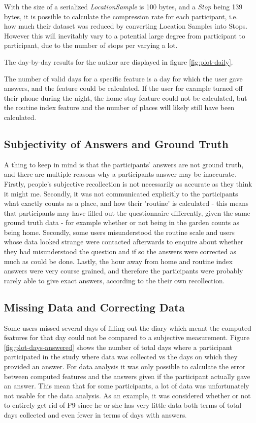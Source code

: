 With the size of a serialized \textit{LocationSample} is 100 bytes, and a \textit{Stop} being 139 bytes, it is possible to calculate the compression rate for each participant, i.e. how much their dataset was reduced by converting Location Samples into Stops. However this will inevitably vary to a potential large degree from participant to participant, due to the number of stops per  varying a lot.

The day-by-day results for the author are displayed in figure \ref{fig:plot-daily}.

The number of valid days for a specific feature is a day for which the user gave answers, and the feature could be calculated. If the user for example turned off their phone during the night, the home stay feature could not be calculated, but the routine index feature and the number of places will likely still have been calculated.


\subsection{Subjectivity of Answers and Ground Truth}
A thing to keep in mind is that the participants' answers are not ground truth, and there are multiple reasons why a participants answer may be inaccurate. Firstly, people's subjective recollection is not necessarily as accurate as they think it might me. Secondly, it was not communicated explicitly to the participants what exactly counts as a place, and how their 'routine' is calculated - this means that participants may have filled out the questionnaire differently, given the same ground truth data - for example whether or not being in the garden counts as being home. Secondly, some users misunderstood the routine scale and users whose data looked strange were contacted afterwards to enquire about whether they had misunderstood the question and if so the answers were corrected as much as could be done. Lastly, the hour away from home and routine index answers were very course grained, and therefore the participants were probably rarely able to give exact answers, according to the their own recollection. 

\subsection{Missing Data and Correcting Data}
Some users missed several days of filling out the diary which meant the computed features for that day could not be compared to a subjective measurement. Figure \ref{fig:plot-days-answered} shows the number of total days where a participant participated in the study where data was collected vs the days on which they provided an answer. For data analysis it was only possible to calculate the error between computed features and the answers given if the participant actually gave an answer. This mean that for some participants, a lot of data was unfortunately not usable for the data analysis. As an example, it was considered whether or not to entirely get rid of P9 since he or she has very little data both terms of total days collected and even fewer in terms of days with answers. 

